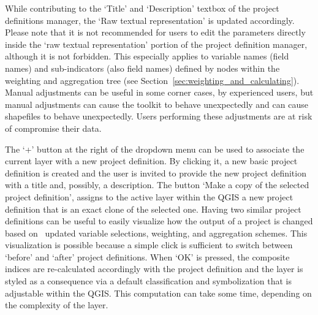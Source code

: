 While contributing to the `Title' and `Description' textbox of the project
definitions manager, the `Raw textual representation' is updated accordingly.
Please note that it is not recommended for users to edit the parameters
directly inside the `raw textual representation' portion of the project
definition manager, although it is not forbidden. This especially applies to
variable names (field names) and sub-indicators (also field names) defined by
nodes within the weighting and aggregation tree (see
Section~\ref{sec:weighting_and_calculating}). Manual adjustments can be useful
in some corner cases, by experienced users, but manual adjustments can cause
the toolkit to behave unexpectedly and can cause shapefiles to behave
unexpectedly. Users performing these adjustments are at risk of compromise
their data.

The `+' button at the right of the dropdown menu can be used to associate the
current layer with a new project definition. By clicking it, a new basic
project definition is created and the user is invited to provide the new
project definition with a title and, possibly, a description.  The button `Make
a copy of the selected project definition', assigns to the active layer within
the QGIS a new project definition that is an exact clone of the selected one.
Having two similar project definitions can be useful to easily visualize how
the output of a project is changed based on  updated variable selections,
weighting, and aggregation schemes. This visualization is possible because a
simple click is sufficient to switch between `before' and `after' project
definitions. When `OK' is pressed, the composite indices are re-calculated
accordingly with the project definition and the layer is styled as a
consequence via a default classification and symbolization that is adjustable
within the QGIS\@. This computation can take some time, depending on the
complexity of the layer.
